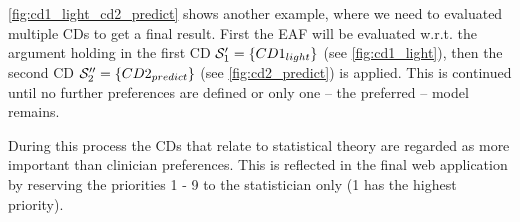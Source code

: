 \autoref{fig:cd1_light_cd2_predict} shows another example, where we need to evaluated multiple \glspl{CD} to get a final result. First the \gls{EAF} will be evaluated w.r.t. the argument holding in the first \gls{CD} $\S_1' = \{CD1_{light}\}$ (see \autoref{fig:cd1_light}), then the second \gls{CD} $\S_2'' = \{CD2_{predict}\}$ (see \autoref{fig:cd2_predict}) is applied. This is continued until no further preferences are defined or only one -- the preferred -- model remains.

During this process the \glspl{CD} that relate to statistical theory are regarded as more important than clinician preferences. This is reflected in the final web application by reserving the priorities 1 - 9 to the statistician only (1 has the highest priority).
 

